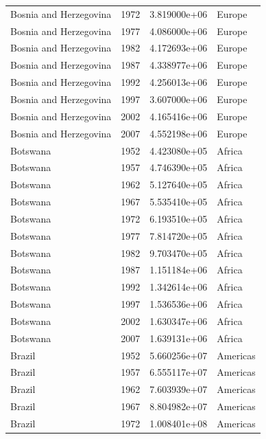 \documentclass[
  letterpaper,
  DIV=11,
  numbers=noendperiod]{scrreprt}
\begin{document}
\begin{tcolorbox}
\begin{tabular}{lrrl}
Bosnia and Herzegovina   &  1972 &  3.819000e+06 &    Europe \\
Bosnia and Herzegovina   &  1977 &  4.086000e+06 &    Europe \\
Bosnia and Herzegovina   &  1982 &  4.172693e+06 &    Europe \\
Bosnia and Herzegovina   &  1987 &  4.338977e+06 &    Europe \\
Bosnia and Herzegovina   &  1992 &  4.256013e+06 &    Europe \\
Bosnia and Herzegovina   &  1997 &  3.607000e+06 &    Europe \\
Bosnia and Herzegovina   &  2002 &  4.165416e+06 &    Europe \\
Bosnia and Herzegovina   &  2007 &  4.552198e+06 &    Europe \\
Botswana                 &  1952 &  4.423080e+05 &    Africa \\
Botswana                 &  1957 &  4.746390e+05 &    Africa \\
Botswana                 &  1962 &  5.127640e+05 &    Africa \\
Botswana                 &  1967 &  5.535410e+05 &    Africa \\
Botswana                 &  1972 &  6.193510e+05 &    Africa \\
Botswana                 &  1977 &  7.814720e+05 &    Africa \\
Botswana                 &  1982 &  9.703470e+05 &    Africa \\
Botswana                 &  1987 &  1.151184e+06 &    Africa \\
Botswana                 &  1992 &  1.342614e+06 &    Africa \\
Botswana                 &  1997 &  1.536536e+06 &    Africa \\
Botswana                 &  2002 &  1.630347e+06 &    Africa \\
Botswana                 &  2007 &  1.639131e+06 &    Africa \\
Brazil                   &  1952 &  5.660256e+07 &  Americas \\
Brazil                   &  1957 &  6.555117e+07 &  Americas \\
Brazil                   &  1962 &  7.603939e+07 &  Americas \\
Brazil                   &  1967 &  8.804982e+07 &  Americas \\
Brazil                   &  1972 &  1.008401e+08 &  Americas \\

\end{tabular}
\end{tcolorbox}
\end{document}
